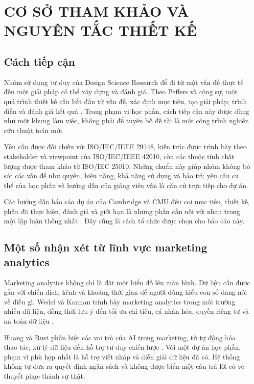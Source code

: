 \chapter{CƠ SỞ THAM KHẢO VÀ NGUYÊN TẮC THIẾT KẾ}

\section{Cách tiếp cận}

Nhóm sử dụng tư duy của Design Science Research để đi từ một vấn đề thực tế đến một giải pháp có thể xây dựng và đánh giá. Theo Peffers và cộng sự, một quá trình thiết kế cần bắt đầu từ vấn đề, xác định mục tiêu, tạo giải pháp, trình diễn và đánh giá kết quả \cite{peffers2007dsrm}. Trong phạm vi học phần, cách tiếp cận này được dùng như một khung làm việc, không phải để tuyên bố đề tài là một công trình nghiên cứu thuật toán mới.

Yêu cầu được đối chiếu với ISO/IEC/IEEE 29148, kiến trúc được trình bày theo stakeholder và viewpoint của ISO/IEC/IEEE 42010, còn các thuộc tính chất lượng được tham khảo từ ISO/IEC 25010. Những chuẩn này giúp nhóm không bỏ sót các vấn đề như quyền, hiệu năng, khả năng sử dụng và bảo trì; yêu cầu cụ thể của học phần và hướng dẫn của giảng viên vẫn là căn cứ trực tiếp cho dự án.

Các hướng dẫn báo cáo dự án của Cambridge và CMU đều coi mục tiêu, thiết kế, phần đã thực hiện, đánh giá và giới hạn là những phần cần nối với nhau trong một lập luận thống nhất \cite{cambridge-dissertation,cambridge-assessment,cmu-capstone}. Đây cũng là cách tổ chức được chọn cho báo cáo này.

\section{Một số nhận xét từ lĩnh vực marketing analytics}

Marketing analytics không chỉ là đặt một biểu đồ lên màn hình. Dữ liệu cần được gắn với chiến dịch, kênh và khoảng thời gian để người dùng hiểu con số đang nói về điều gì. Wedel và Kannan trình bày marketing analytics trong môi trường nhiều dữ liệu, đồng thời lưu ý đến tối ưu chi tiêu, cá nhân hóa, quyền riêng tư và an toàn dữ liệu \cite{wedel-kannan}.

Huang và Rust phân biệt các vai trò của AI trong marketing, từ tự động hóa thao tác, xử lý dữ liệu đến hỗ trợ tư duy chiến lược \cite{huang-rust}. Với một dự án học phần, phạm vi phù hợp nhất là hỗ trợ viết nháp và diễn giải dữ liệu đã có. Hệ thống không tự đưa ra quyết định ngân sách và không được biến một câu trả lời có vẻ thuyết phục thành sự thật.

